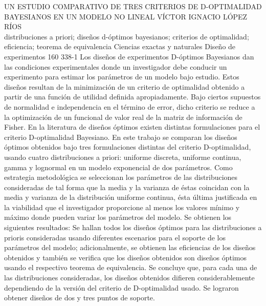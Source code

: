 \A
{UN ESTUDIO COMPARATIVO DE TRES CRITERIOS DE D-OPTIMALIDAD BAYESIANOS EN UN MODELO NO LINEAL}
{VÍCTOR IGNACIO LÓPEZ RÍOS}
{
\\
}
{distribuciones a priori; diseños d-óptimos bayesianos; criterios de optimalidad; eficiencia; teorema de equivalencia} 
 {Ciencias exactas y naturales} 
 {Diseño de experimentos} 
 {160} 
 {338-1}
{Los diseños de experimentos D-óptimos Bayesianos dan las condiciones experimentales donde un investigador debe conducir un experimento para estimar los parámetros de un modelo bajo estudio. Estos diseños resultan de la minimización de un criterio de optimalidad obtenido a partir de una función de utilidad definida apropiadamente. Bajo ciertos supuestos de normalidad e independencia en el término de error, dicho criterio se reduce a la optimización de un funcional de valor real de la matriz de información de Fisher. En la literatura de diseños óptimos existen distintas formulaciones para el criterio D-optimalidad Bayesiano. En este trabajo se comparan los diseños óptimos obtenidos bajo tres formulaciones distintas del criterio D-optimalidad, usando cuatro distribuciones a priori: uniforme discreta, uniforme continua, gamma y lognormal en un modelo exponencial de dos parámetros. Como estrategia metodológica se seleccionan los parámetros de las distribuciones consideradas de tal forma que la media y la varianza de éstas coincidan con la media y varianza de la distribución uniforme continua, ésta última justificada en la viabilidad que el investigador proporcione al menos los valores mínimo y máximo donde pueden variar los parámetros del modelo. Se obtienen los siguientes resultados: Se hallan todos los diseños óptimos para las distribuciones a prioris consideradas usando diferentes escenarios para el soporte de los parámetros del modelo; adicionalmente, se obtienen las eficiencias de los diseños obtenidos y también se verifica que los diseños obtenidos son diseños óptimos usando el respectivo teorema de equivalencia. Se concluye que, para cada una de las distribuciones consideradas, los diseños obtenidos difieren considerablemente dependiendo de la versión del criterio de D-optimalidad usado. Se lograron obtener diseños de dos y tres puntos de soporte.}
